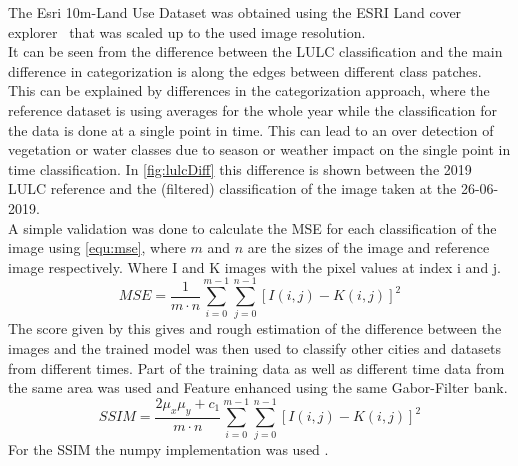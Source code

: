 \documentclass[12pt,a4paper, english,twoside]{article}
\begin{document}
      The Esri 10m-Land Use Dataset was obtained using the ESRI Land cover explorer~\autocite{Zhang} that was scaled up to the used image resolution. \\
      It can be seen from the difference between the \gls{LULC} classification and the main difference in categorization is along the edges between different class patches. 
      This can be explained by differences in the categorization approach, where the reference dataset is using averages for the whole year while the classification for the data is done at a single point in time. 
      This can lead to an over detection of vegetation or water classes due to season or weather impact on the single point in time classification.
      In \cref{fig:lulcDiff} this difference is shown between the 2019 \gls{LULC} reference and the (filtered) classification of the image taken at the 26-06-2019. \\ 
      A simple validation was done to calculate the \gls{MSE} for each classification of the image using \cref{equ:mse}, where  $m$ and $n$ are the sizes of the image and reference image respectively. Where I and K images with the pixel values at index i and j. 
      \begin{equation}\label{equ:mse}
        MSE = \frac{1}{m\cdot n}\sum_{i=0}^{m-1} \sum_{j=0}^{n-1} \left[I(i,j)-K(i,j)\right]^2
      \end{equation}
      The score given by this gives and rough estimation of the difference between the images and the trained model was then used to classify other cities and datasets from different times. 
      Part of the training data as well as different time data from the same area was used and Feature enhanced using the same Gabor-Filter bank.
      \begin{equation}\label{equ:ssim}
        SSIM = \frac{2\mu_x\mu_y+c_1}{m\cdot n}\sum_{i=0}^{m-1} \sum_{j=0}^{n-1} \left[I(i,j)-K(i,j)\right]^2
      \end{equation}
      For the SSIM the numpy implementation was used \autocite{harris2020array}.
\end{document}
